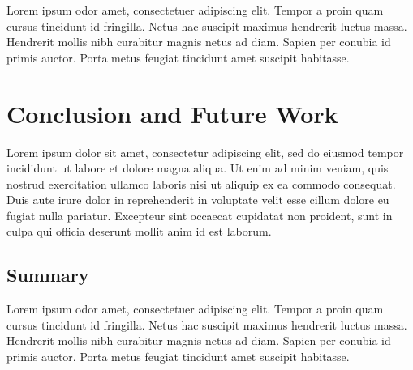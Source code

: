\documentclass[10pt,twocolumn,letterpaper]{article}
\begin{document}
Lorem ipsum odor amet, consectetuer adipiscing elit. Tempor a proin quam cursus
tincidunt id fringilla. Netus hac suscipit maximus hendrerit luctus massa.
Hendrerit mollis nibh curabitur magnis netus ad diam. Sapien per conubia id
primis auctor. Porta metus feugiat tincidunt amet suscipit habitasse.


\section{Conclusion and Future Work}\label{sec:conclusion-and-future-work}

Lorem ipsum dolor sit amet, consectetur adipiscing elit, sed do eiusmod tempor
incididunt ut labore et dolore magna aliqua. Ut enim ad minim veniam, quis
nostrud exercitation ullamco laboris nisi ut aliquip ex ea commodo consequat.
Duis aute irure dolor in reprehenderit in voluptate velit esse cillum dolore eu
fugiat nulla pariatur. Excepteur sint occaecat cupidatat non proident, sunt in
culpa qui officia deserunt mollit anim id est laborum.


\subsection{Summary}

Lorem ipsum odor amet, consectetuer adipiscing elit. Tempor a proin quam cursus
tincidunt id fringilla. Netus hac suscipit maximus hendrerit luctus massa.
Hendrerit mollis nibh curabitur magnis netus ad diam. Sapien per conubia id
primis auctor. Porta metus feugiat tincidunt amet suscipit habitasse.


    {\small
        
        
    }
\end{document}
